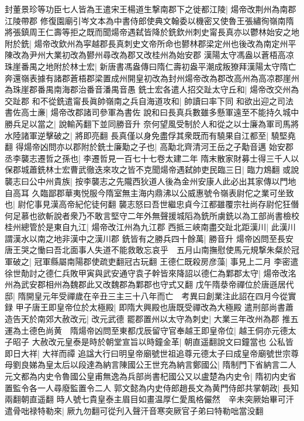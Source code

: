 封董景珍等功臣七人皆為王遣宋王楊道生撃南郡下之徙都江陵|{
	煬帝改荆州為南郡江陵帶郡}
修復園廟引岑文本為中書侍郎使典文翰委以機密又使魯王張繡徇嶺南隋將張鎮周王仁壽等拒之既而聞煬帝遇弑皆降於銑欽州刺史甯長真亦以鬱林始安之地附於銑|{
	煬帝改欽州為寜越郡長真刺史文帝所命也鬰林郡梁定州也後改為南定州平陳改為尹州大業初改為鬰州尋改為郡又改桂州為始安郡}
漢陽太守馮盎以蒼梧高凉珠崖番禺之地附於林士宏|{
	新唐書馮盎傳曰隋仁壽初盎平潮成叛獠拜漢陽太守隋亡奔還嶺表據有諸郡蒼梧郡梁置成州開皇初改為封州煬帝改為郡改高州為高凉郡崖州為珠崖郡番禺南海郡治番音潘禺音愚}
銑士宏各遣人招交趾太守丘和|{
	煬帝改交州為交趾郡}
和不從銑遣甯長眞帥嶺南之兵自海道攻和|{
	帥讀曰率下同}
和欲出迎之司法書佐高士亷|{
	煬帝改郡諸司參軍為書佐}
說和曰長真兵數雖多懸軍遠至不能持久城中勝兵足以當之|{
	說輸芮翻下並同勝音升}
奈何望風受制於人和從之以士廉為軍司馬將水陸諸軍逆擊破之|{
	將即亮翻}
長真僅以身免盡俘其衆既而有驍果自江都至|{
	驍堅堯翻}
得煬帝凶問亦以郡附於銑士廉勱之子也|{
	高勱北齊清河王岳之子勱音邁}
始安郡丞李襲志遷哲之孫也|{
	李遷哲見一百七十七卷太建二年}
隋末散家財募士得三千人以保郡城蕭銑林士宏曹武徹迭來攻之皆不克聞煬帝遇弑帥吏民臨三日|{
	臨力鴆翻}
或說襲志曰公中州貴族|{
	按李襲志之先隴西狄道人後為金州安康人此必出其家傳以門地自高耳}
久臨鄙郡華夷悦服今隋室無主海内鼎沸以公威惠號令嶺表尉佗之業可坐致也|{
	尉佗事見漢高帝紀佗徒何翻}
襲志怒曰吾世繼忠貞今江都雖覆宗社尚存尉佗狂僭何足慕也欲斬說者衆乃不敢言堅守二年外無聲援城䧟為銑所虜銑以為工部尚書檢校桂州總管於是東自九江|{
	煬帝改江州為九江郡}
西抵三峽南盡交趾北距漢川|{
	此漢川謂漢水以南之地非漢中之漢川郡}
銑皆有之勝兵四十餘萬|{
	勝音升}
煬帝凶問至長安唐王哭之慟曰吾北面事人失道不能救敢忘哀乎　五月山南撫慰使馬元規撃朱粲於冠軍破之|{
	冠軍縣屬南陽郡使疏吏翻冠古玩翻}
王德仁既殺房彦藻|{
	事見上二月}
李密遣徐世勣討之德仁兵敗甲寅與武安通守袁子幹皆來降詔以德仁為鄴郡太守|{
	煬帝改洺州為武安郡相州為魏郡此又改魏郡為鄴郡也守式又翻}
戊午隋㳟帝禪位於唐遜居代邸|{
	隋開皇元年受禪歲在辛丑三主三十八年而亡　考異曰創業注此詔在四月今從實録}
甲子唐王即皇帝位於太極殿|{
	即隋大興殿也唐既受禪改為大極殿}
遣刑部尚書蕭造告天於南郊大赦改元|{
	改元武德}
罷郡置州以太守為刺史|{
	大業三年改州為郡}
推五運為土德色尚黄　隋煬帝凶問至東都戊辰留守官奉越王即皇帝位|{
	越王侗亦元德太子昭子}
大赦改元皇泰是時於朝堂宣旨以時鐘金革|{
	朝直遥翻說文曰鐘當也}
公私皆即日大祥|{
	大祥而禫}
追諡大行曰明皇帝廟號世祖追尊元德太子曰成皇帝廟號世宗尊母劉良娣為皇太后以段達為納言陳國公王世充為納言鄭國公|{
	隋制門下省納言二人}
元文都為内史令魯國公皇甫無逸為兵部尚書杞國公又以盧楚為内史令|{
	隋初内史省置監令各一人尋廢監置令二人}
郭文懿為内史侍郎趙長文為黄門侍郎共掌朝政|{
	長知兩翻朝直遥翻}
時人號七貴皇泰主眉目如畫温厚仁愛風格儼然　辛未突厥始畢可汗遣骨咄禄特勒來|{
	厥九勿翻可從刋入聲汗音寒突厥官子弟曰特勒咄當没翻}
